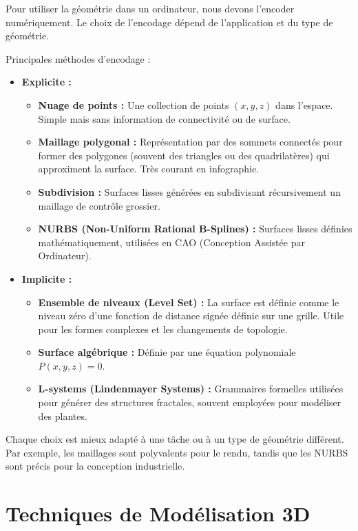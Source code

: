 \documentclass{article}
\begin{document}
Pour utiliser la géométrie dans un ordinateur, nous devons l'encoder numériquement. Le choix de l'encodage dépend de l'application et du type de géométrie.

Principales méthodes d'encodage :
\begin{itemize}
    \item \textbf{Explicite :}
        \begin{itemize}
            \item \textbf{Nuage de points :} Une collection de points $(x, y, z)$ dans l'espace. Simple mais sans information de connectivité ou de surface.
            \item \textbf{Maillage polygonal :} Représentation par des sommets connectés pour former des polygones (souvent des triangles ou des quadrilatères) qui approximent la surface. Très courant en infographie.
            \item \textbf{Subdivision :} Surfaces lisses générées en subdivisant récursivement un maillage de contrôle grossier.
            \item \textbf{NURBS (Non-Uniform Rational B-Splines) :} Surfaces lisses définies mathématiquement, utilisées en CAO (Conception Assistée par Ordinateur).
        \end{itemize}
    \item \textbf{Implicite :}
        \begin{itemize}
            \item \textbf{Ensemble de niveaux (Level Set) :} La surface est définie comme le niveau zéro d'une fonction de distance signée définie sur une grille. Utile pour les formes complexes et les changements de topologie.
            \item \textbf{Surface algébrique :} Définie par une équation polynomiale $P(x, y, z) = 0$.
            \item \textbf{L-systems (Lindenmayer Systems) :} Grammaires formelles utilisées pour générer des structures fractales, souvent employées pour modéliser des plantes.
        \end{itemize}
\end{itemize}
Chaque choix est mieux adapté à une tâche ou à un type de géométrie différent. Par exemple, les maillages sont polyvalents pour le rendu, tandis que les NURBS sont précis pour la conception industrielle.

\section{Techniques de Modélisation 3D}
\end{document}
